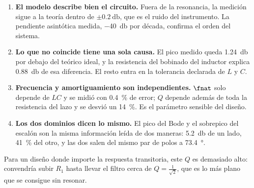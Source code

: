 \begin{enumerate}[itemsep=3pt, topsep=4pt]
  \item \textbf{El modelo describe bien el circuito.} Fuera de la resonancia, la
        medición sigue a la teoría dentro de $\pm\SI{0.2}{\decibel}$, que es el
        ruido del instrumento. La pendiente asintótica medida,
        \SI{-40}{\decibel} por década, confirma el orden del sistema.
  \item \textbf{Lo que no coincide tiene una sola causa.} El pico medido queda
        \SI{1.24}{\decibel} por debajo del teórico ideal, y la resistencia del
        bobinado del inductor explica \SI{0.88}{\decibel} de esa diferencia. El
        resto entra en la tolerancia declarada de $L$ y $C$.
  \item \textbf{Frecuencia y amortiguamiento son independientes.} $\fnat$ solo
        depende de $LC$ y se midió con \SI{0.4}{\percent} de error; $Q$ depende
        además de toda la resistencia del lazo y se desvió un
        \SI{14}{\percent}. Es el parámetro sensible del diseño.
  \item \textbf{Los dos dominios dicen lo mismo.} El pico del Bode y el
        sobrepico del escalón son la misma información leída de dos maneras:
        \SI{5.2}{\decibel} de un lado, \SI{41}{\percent} del otro, y las dos
        salen del mismo par de polos a \SI{73.4}{\degree}.
\end{enumerate}

\noindent
Para un diseño donde importe la respuesta transitoria, este $Q$ es demasiado
alto: convendría subir $R_1$ hasta llevar el filtro cerca de
$Q = \tfrac{1}{\sqrt{2}}$, que es lo más plano que se consigue sin resonar.
